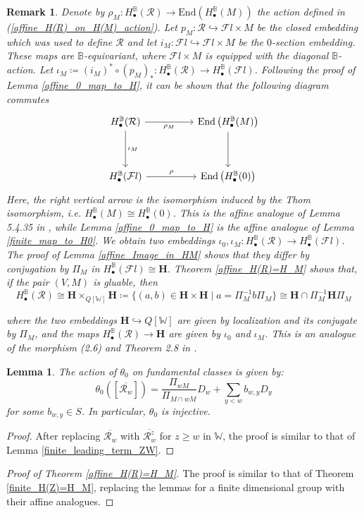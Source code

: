 \documentclass[11pt]{article}
\newcommand{\R}{\mathcal{R}}
\renewcommand{\H}{\textbf{H}}
\newcommand{\bbB}{\mathbb{B}}
\newcommand{\1}{\mathbb{1}}
\newcommand{\tW}{\mathbb{W}}
\newcommand{\HBM}[2]{H_\bullet^{#1}(#2)}
\newcommand{\Fl}{\mathcal{F}l}
\newcommand{\End}{\text{End}}
\newtheorem{lemma}[theorem]{Lemma}
\newtheorem{remark}[theorem]{Remark}
\theoremstyle{definition}
\numberwithin{equation}{section}
\begin{document}
\begin{remark}
    Denote by $\rho_M : \HBM{\bbB}{\R} \rightarrow  \End \left( \HBM{\bbB}{M}\right)$ the action defined in (\ref{affine_H(R)_on_H(M)_action}). Let $p_M:\R \hookrightarrow \Fl\times M$ be the closed embedding which was used to define $\R$ and let $i_M : \Fl \hookrightarrow \Fl \times M$ be the $0$-section embedding. These maps are $\bbB$-equivariant, where $\Fl \times M$ is equipped with the diagonal $\bbB$-action. Let $\iota_M\coloneqq (i_M)^* \circ (p_M)_* : \HBM{\bbB}{\R} \rightarrow \HBM{\bbB}{\Fl}$. Following the proof of Lemma \ref{affine_0_map_to_H}, it can be shown that the following diagram commutes
    \[\begin{tikzcd}
	\HBM{\bbB}{\R}  &&   \End \left( \HBM{\bbB}{M}\right)\\
	\\
	\HBM{\bbB}{\Fl} &&  \End \left( \HBM{\bbB}{0}\right)
	\arrow["\rho_M"', from=1-1, to=1-3]
	\arrow["\iota_M", from=1-1, to=3-1]
	\arrow[from=1-3, to=3-3]
	\arrow["\rho",from=3-1, to=3-3]
\end{tikzcd}\]
Here, the right vertical arrow is the isomorphism induced by the Thom isomorphism, i.e. $\HBM{\bbB}{M} \cong \HBM{\bbB}{0}$. This is the affine analogue of Lemma 5.4.35 in \cite{CG}, while Lemma \ref{affine_0_map_to_H} is the affine analogue of Lemma \ref{finite_map_to_H0}. We obtain two embeddings $\iota_0, \iota_M : \HBM{\bbB}{\R} \rightarrow \HBM{\bbB}{\Fl}$. The proof of Lemma \ref{affine_Image_in_HM} shows that they differ by conjugation by $\Pi_M$ in $\HBM{\bbB}{\Fl} \cong \H$. Theorem \ref{affine_H(R)=H_M} shows that, if the pair $(V,M)$ is gluable, then 
$$\HBM{\bbB}{\R} \cong \H \times_{Q[\tW]} \H \coloneqq \{ (a,b) \in \H \times \H \mid  a = \Pi_M^{-1} b \Pi_M \} \cong \H \cap \Pi_M^{-1} \H \Pi_M$$

\noindent where the two embeddings $\H \hookrightarrow Q[\tW]$ are given by localization and its conjugate by $\Pi_M$, and the maps $\HBM{\bbB}{\R} \rightarrow \H$ are given by $\iota_0$ and $\iota_M$. This is an analogue of the morphism (2.6) and Theorem 2.8 in \cite{GW}.
\end{remark}

\begin{lemma}
\label{affine_leading_term_RW}
    The action of $\theta_0$ on fundamental classes is given by:
    $$\theta_0\left(\left[\overline{\R_w}\right]\right) = \frac{\Pi_{wM}}{\Pi_{M\cap wM}} D_w + \sum_{y< w} b_{w,y} D_y$$
    for some $b_{w,y} \in S$.
    In particular, $\theta_0$ is injective.
\end{lemma}

\begin{proof}
    After replacing $\overline{\R_w}$ with $\overline{\R^z_w}$ for $z\geq w$ in $\tW$, the proof is similar to that of Lemma \ref{finite_leading_term_ZW}.
\end{proof}

\begin{proof}[Proof of Theorem \ref{affine_H(R)=H_M}]
    The proof is similar to that of Theorem \ref{finite_H(Z)=H_M}, replacing the lemmas for a finite dimensional group with their affine analogues.
\end{proof}

\printbibliography
\end{document}
